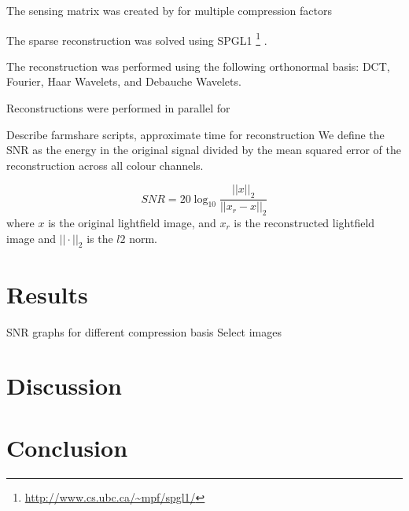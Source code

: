 \documentclass[10pt,twocolumn,letterpaper]{article}
\begin{document}
The sensing matrix was created by for multiple compression factors

The sparse reconstruction was solved using SPGL1 \footnote{\url{http://www.cs.ubc.ca/~mpf/spgl1/}} \cite{BasisPursuit1}\cite{BasisPursuit2}.

The reconstruction was performed using the following orthonormal basis: DCT, Fourier, Haar Wavelets, and Debauche Wavelets.

Reconstructions were performed in parallel for 

Describe farmshare scripts, approximate time for reconstruction
We define the SNR as the energy in the original signal divided by the mean squared error of the reconstruction across all colour channels. 

\[SNR = 20 \log_{10}{\frac{||x||_2}{||x_r - x||_2}}\] where $x$ is the original lightfield image, and $x_r$ is the reconstructed lightfield image and $|| \cdot ||_2$ is the $l2$ norm.

\section{Results}

SNR graphs for different compression basis
Select images

\section{Discussion}

\section{Conclusion}



{\small


}
\end{document}
